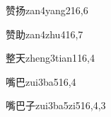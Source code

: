 \begin{verbete}{赞扬}{zan4yang2}{16,6}
\end{verbete}

\begin{verbete}{赞助}{zan4zhu4}{16,7}
\end{verbete}

\begin{verbete}{整天}{zheng3tian1}{16,4}
\end{verbete}

\begin{verbete}{嘴巴}{zui3ba5}{16,4}
\end{verbete}

\begin{verbete}{嘴巴子}{zui3ba5zi5}{16,4,3}
\end{verbete}


